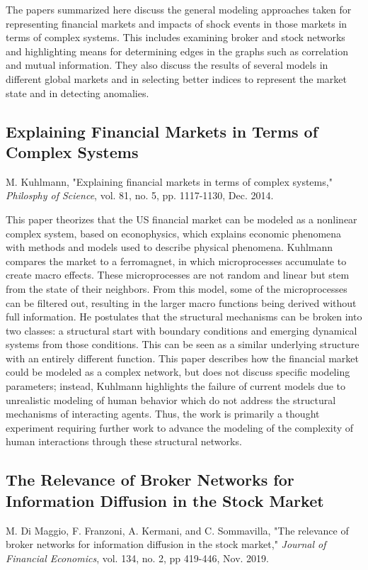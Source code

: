 \documentclass[12pt]{article}
\begin{document}
The papers summarized here discuss the general modeling approaches taken for representing financial markets and impacts of shock events in those markets in terms of complex systems. This includes examining broker and stock networks and highlighting means for determining edges in the graphs such as correlation and mutual information. They also discuss the results of several models in different global markets and in selecting better indices to represent the market state and in detecting anomalies.


\subsection{Explaining Financial Markets in Terms of Complex Systems}
M. Kuhlmann, "Explaining financial markets in terms of complex systems," \textit{Philosphy of Science}, vol. 81, no. 5, pp. 1117-1130, Dec. 2014. %
\newline

This paper theorizes that the US financial market can be modeled as a nonlinear complex system, based on econophysics, which explains economic phenomena with methods and models used to describe physical phenomena. Kuhlmann compares the market to a ferromagnet, in which microprocesses accumulate to create macro effects. These microprocesses are not random and linear but stem from the state of their neighbors. From this model, some of the microprocesses can be filtered out, resulting in the larger macro functions being derived without full information. He postulates that the structural mechanisms can be broken into two classes: a structural start with boundary conditions and emerging dynamical systems from those conditions. This can be seen as a similar underlying structure with an entirely different function. This paper describes how the financial market could be modeled as a complex network, but does not discuss specific modeling parameters; instead, Kuhlmann highlights the failure of current models due to unrealistic modeling of human behavior which do not address the structural mechanisms of interacting agents. Thus, the work is primarily a thought experiment requiring further work to advance the modeling of the complexity of human interactions through these structural networks.


\subsection{The Relevance of Broker Networks for Information Diffusion in the Stock Market}
M. Di Maggio, F. Franzoni, A. Kermani, and C. Sommavilla, "The relevance of broker networks for information diffusion in the stock market," \textit{Journal of Financial Economics}, vol. 134, no. 2, pp 419-446, Nov. 2019. %
\newline
\end{document}
